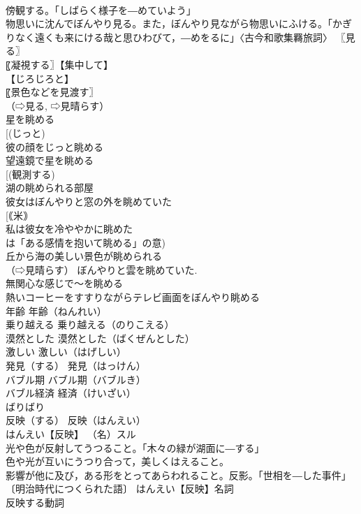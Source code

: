 \documentclass[8pt]{extreport}
\begin{document}
\begin{CJK}{UTF8}{min}
\\	傍観する。「しばらく様子を―めていよう」 
\\	物思いに沈んでぼんやり見る。また，ぼんやり見ながら物思いにふける。「かぎりなく遠くも来にける哉と思ひわびて，―めをるに」〈古今和歌集羇旅詞〉 〖見る〗
\\	〖凝視する〗【集中して】
\\	【じろじろと】
\\	〖景色などを見渡す〗
\\	（⇨見る, ⇨見晴らす） 
\\	星を眺める 
\\	[(じっと) 
\\	彼の顔をじっと眺める 
\\	望遠鏡で星を眺める 
\\	[(観測する) 
\\	湖の眺められる部屋 
\\	彼女はぼんやりと窓の外を眺めていた 
\\	[｟米｠ 
\\	私は彼女を冷ややかに眺めた 
\\	は「ある感情を抱いて眺める」の意) 
\\	丘から海の美しい景色が眺められる 
\\	（⇨見晴らす） ぼんやりと雲を眺めていた. 
\\	無関心な感じで～を眺める 
\\	熱いコーヒーをすすりながらテレビ画面をぼんやり眺める 
\\	年齢		年齢（ねんれい） 
\\	乗り越える		乗り越える（のりこえる） 
\\	漠然とした		漠然とした（ばくぜんとした） 
\\	激しい		激しい（はげしい） 
\\	発見（する）		発見（はっけん） 
\\	バブル期		バブル期（バブルき） 
\\	バブル経済		経済（けいざい） 
\\	ばりばり		
\\	反映（する）		反映（はんえい） 
\\	はんえい【反映】 （名）スル 
\\	光や色が反射してうつること。「木々の緑が湖面に―する」 
\\	色や光が互いにうつり合って，美しくはえること。 
\\	影響が他に及び，ある形をとってあらわれること。反影。「世相を―した事件」〔明治時代につくられた語〕 はんえい【反映】名詞 
\\	反映する動詞 

\end{CJK}
\end{document}

